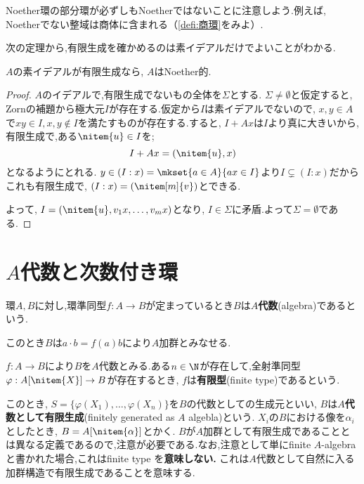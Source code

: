 Noether環の部分環が必ずしもNoetherではないことに注意しよう.例えば, Noetherでない整域は商体に含まれる（\ref{defi:商環}をみよ）.

次の定理から,有限生成を確かめるのは素イデアルだけでよいことがわかる.
\begin{thm}[I.S.Cohen]
	$A$の素イデアルが有限生成なら, $A$はNoether的.
\end{thm}
\begin{proof}
	$A$のイデアルで,有限生成でないもの全体を$\Sigma$とする. $\Sigma\neq\emptyset$と仮定すると, Zornの補題から極大元$I$が存在する.仮定から$I$は素イデアルでないので, $x,y\in A$で$xy\in I,x,y\not\in I$を満たすものが存在する.すると, $I+Ax$は$I$より真に大きいから,有限生成で,ある$\nitem{u}\in I$を;
	\[I+Ax=(\nitem{u},x)\]
	となるようにとれる. $y\in (I:x)=\mkset{a\in A}{ax\in I}$より$I\subsetneq(I:x)$だからこれも有限生成で, $(I:x)=(\nitem[m]{v})$とできる.
	
	よって, $I=(\nitem{u},v_1x,\dots,v_mx)$となり, $I\in\Sigma$に矛盾.よって$\Sigma=\emptyset$である.
\end{proof}

\section{$A$代数と次数付き環}
\begin{defi}[$A$代数]
	環$A,B$に対し,環準同型$f:A\to B$が定まっているとき$B$は$A$\textbf{代数}(algebra)であるという.
\end{defi}

このとき$B$は$a\cdot b=f(a)b$により$A$加群とみなせる.

\begin{defi}[有限型]
	$f:A\to B$により$B$を$A$代数とみる.ある$n\in\N$が存在して,全射準同型$\varphi:A[\nitem{X}]\to B$が存在するとき, $f$は\textbf{有限型}(finite type)であるという.
\end{defi}

このとき, $S=\{\varphi(X_1),\dots,\varphi(X_n)\}$を$B$の代数としての生成元といい, $B$は$A$\textbf{代数として有限生成}(finitely generated as $A$ algebla)という. $X_i$の$B$における像を$\alpha_i$としたとき, $B=A[\nitem{\alpha}]$とかく. $B$が$A$加群として有限生成であることとは異なる定義であるので,注意が必要である.なお,注意として単にfinite $A$-algebraと書かれた場合,これはfinite type を\textbf{意味しない.} これは$A$代数として自然に入る加群構造で有限生成であることを意味する. 

